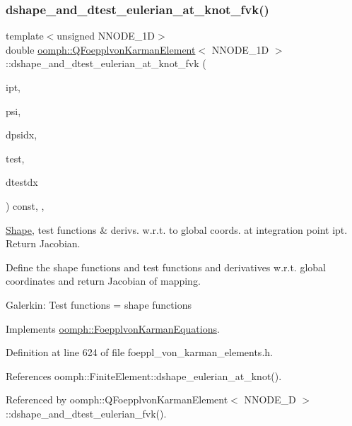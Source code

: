 \subsubsection{\texorpdfstring{dshape\+\_\+and\+\_\+dtest\+\_\+eulerian\+\_\+at\+\_\+knot\+\_\+fvk()}{dshape\_and\_dtest\_eulerian\_at\_knot\_fvk()}}
{\footnotesize\ttfamily template$<$unsigned N\+N\+O\+D\+E\+\_\+1D$>$ \\
double \hyperlink{classoomph_1_1QFoepplvonKarmanElement}{oomph\+::\+Q\+Foepplvon\+Karman\+Element}$<$ N\+N\+O\+D\+E\+\_\+1D $>$\+::dshape\+\_\+and\+\_\+dtest\+\_\+eulerian\+\_\+at\+\_\+knot\+\_\+fvk (\begin{DoxyParamCaption}\item[{const unsigned \&}]{ipt,  }\item[{\hyperlink{classoomph_1_1Shape}{Shape} \&}]{psi,  }\item[{\hyperlink{classoomph_1_1DShape}{D\+Shape} \&}]{dpsidx,  }\item[{\hyperlink{classoomph_1_1Shape}{Shape} \&}]{test,  }\item[{\hyperlink{classoomph_1_1DShape}{D\+Shape} \&}]{dtestdx }\end{DoxyParamCaption}) const\hspace{0.3cm}{\ttfamily [inline]}, {\ttfamily [protected]}, {\ttfamily [virtual]}}



\hyperlink{classoomph_1_1Shape}{Shape}, test functions \& derivs. w.\+r.\+t. to global coords. at integration point ipt. Return Jacobian. 

Define the shape functions and test functions and derivatives w.\+r.\+t. global coordinates and return Jacobian of mapping.

Galerkin\+: Test functions = shape functions 

Implements \hyperlink{classoomph_1_1FoepplvonKarmanEquations_aab91609ffb4a1ae2ae32ef7cb44f887e}{oomph\+::\+Foepplvon\+Karman\+Equations}.



Definition at line 624 of file foeppl\+\_\+von\+\_\+karman\+\_\+elements.\+h.



References oomph\+::\+Finite\+Element\+::dshape\+\_\+eulerian\+\_\+at\+\_\+knot().



Referenced by oomph\+::\+Q\+Foepplvon\+Karman\+Element$<$ N\+N\+O\+D\+E\+\_\+D $>$\+::dshape\+\_\+and\+\_\+dtest\+\_\+eulerian\+\_\+fvk().

